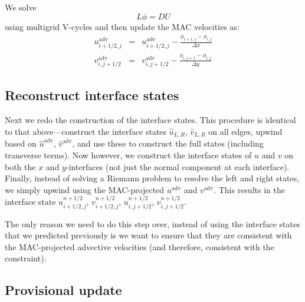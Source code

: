 We solve
\begin{equation}
L\phi = DU
\end{equation}
using multigrid V-cycles and then update the MAC velocities as:
\begin{eqnarray}
u^\mathrm{adv}_{i+1/2,j} &=& u^\mathrm{adv}_{i+1/2,j} - 
    \frac{\phi_{i+1,j} - \phi_{i,j}}{\Delta x} \\
%
v^\mathrm{adv}_{i,j+1/2} &=& v^\mathrm{adv}_{i,j+1/2} - 
    \frac{\phi_{i,j+1} - \phi_{i,j}}{\Delta y}
\end{eqnarray}


\subsection{Reconstruct interface states}

Next we redo the construction of the interface states.  This procedure
is identical to that above---construct the interface states
$\hat{u}_{L,R}$, $\hat{v}_{L,R}$ on all edges, upwind based on
$\hat{u}^\mathrm{adv}$, $\hat{v}^\mathrm{adv}$, and use these to
construct the full states (including transverse terms).  Now however,
we construct the interface states of $u$ and $v$ on both the $x$ and
$y$-interfaces (not just the normal component at each interface).
Finally, instead of solving a Riemann problem to resolve the left and
right states, we simply upwind using the MAC-projected
$u^\mathrm{adv}$ and $v^\mathrm{adv}$.  This results in the interface
state $u^{n+1/2}_{i+1/2,j}$, $v^{n+1/2}_{i+1/2,j}$, $u^{n+1/2}_{i,j+1/2}$,
$v^{n+1/2}_{i,j+1/2}$.

The only reason we need to do this step over, instead of using the
interface states that we predicted previously is we want to ensure
that they are consistent with the MAC-projected advective velocities
(and therefore, consistent with the constraint).

\subsection{Provisional update}

